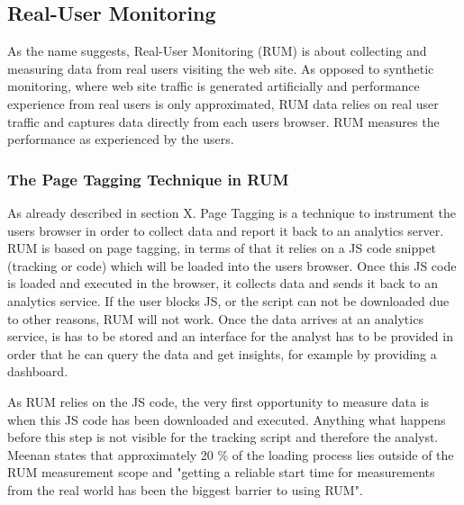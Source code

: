 \subsection{Real-User Monitoring}



As the name suggests, Real-User Monitoring (RUM) is about collecting and measuring data from real users visiting the web site.
As opposed to synthetic monitoring, where web site traffic is generated artificially and performance experience from real users is only approximated, RUM data relies on real user traffic and captures data directly from each users browser. 
RUM measures the performance as experienced by the users. %



\subsubsection{The Page Tagging Technique in RUM}


As already described in section X. Page Tagging is a technique to instrument the users browser in order to collect data and report it back to an analytics server.
RUM is based on page tagging, in terms of that it relies on a JS code snippet (tracking or code) which will be loaded into the users browser.
Once this JS code is loaded and executed in the browser, it collects data and sends it back to an analytics service.
If the user blocks JS, or the script can not be downloaded due to other reasons,  RUM will not work.
Once the data arrives at an analytics service, is has to be stored and an interface for the analyst has to be provided in order that he can query the data and get insights, for example by providing a dashboard. %

As RUM relies on the JS code, the very first opportunity to measure data is when this JS code has been downloaded and executed.
Anything what happens before this step is not visible for the tracking script and therefore the analyst.
Meenan states that approximately 20 \% of the loading process lies outside of the RUM measurement scope and "getting a reliable start time for measurements from the real world has been the biggest barrier to using RUM".%

